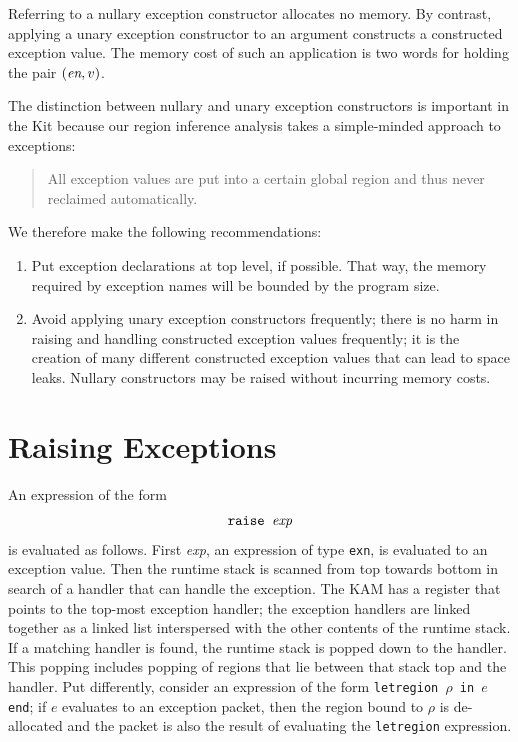 \documentclass[12pt]{book}
\begin{document}
Referring to a nullary exception constructor allocates no memory. By
contrast, applying a unary exception constructor to an argument
constructs a constructed exception value. The memory cost of such an
application is two words for holding the pair $(\hbox{\it en}, v)$.

The distinction between nullary and unary exception constructors
is important in the Kit because our region inference analysis
takes a simple-minded approach to exceptions: 
\begin{quote}
  All exception values are put into a certain
  global region and thus never reclaimed automatically.
\end{quote}
We therefore make the following recommendations:
\begin{enumerate}
\item Put exception declarations at top level, if possible.
      That way, the memory required by exception names will
       be bounded by the program size.
\item Avoid applying unary exception constructors frequently; there is
      no harm in raising and handling constructed exception values frequently;
      it is the creation of many different constructed exception values
      that can lead to space leaks. Nullary
      constructors may be raised 
	  without incurring memory costs.
\end{enumerate}

\section{Raising Exceptions}
An expression of the form 
$$\hbox{\tt raise {\it exp}}$$
is evaluated as follows. First {\it exp}, an expression of 
type {\tt exn}, is evaluated to an exception value. Then the runtime
stack is scanned from top towards bottom in search of a handler
that can handle the exception. The KAM has a register that points
to the top-most exception handler; the exception handlers are linked
together as a linked list interspersed with the other contents of
the runtime stack. If a matching handler is found, the runtime stack
is popped down to the handler. This popping includes popping of regions
that lie between that stack top and the handler. Put differently,
consider an expression of the form 
{\tt letregion $\rho$ in $e$ end}; if $e$ evaluates to an exception packet,
then the region bound to $\rho$ is de-allocated and the packet is also
the result of evaluating the \texttt{letregion} expression.
\end{document}
